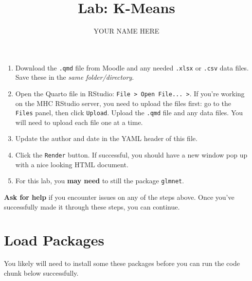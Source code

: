 \documentclass[
  letterpaper,
  DIV=11,
  numbers=noendperiod]{scrartcl}
\title{Lab: K-Means}
\author{YOUR NAME HERE}
\date{}
\begin{document}
\maketitle


\begin{tcolorbox}[enhanced jigsaw, opacitybacktitle=0.6, toprule=.15mm, left=2mm, toptitle=1mm, breakable, titlerule=0mm, colframe=quarto-callout-tip-color-frame, arc=.35mm, colback=white, colbacktitle=quarto-callout-tip-color!10!white, opacityback=0, bottomtitle=1mm, coltitle=black, title=\textcolor{quarto-callout-tip-color}{\faLightbulb}\hspace{0.5em}{Getting Started}, leftrule=.75mm, rightrule=.15mm, bottomrule=.15mm]

\begin{enumerate}
\def\labelenumi{\arabic{enumi}.}
\item
  Download the \texttt{.qmd} file from Moodle and any needed
  \texttt{.xlsx} or \texttt{.csv} data files. Save these in the
  \emph{same folder/directory}.
\item
  Open the Quarto file in RStudio:
  \texttt{File\ \textgreater{}\ Open\ File...\ \textgreater{}}. If
  you're working on the MHC RStudio server, you need to upload the files
  first: go to the \texttt{Files} panel, then click \texttt{Upload}.
  Upload the \texttt{.qmd} file and any data files. You will need to
  upload each file one at a time.
\item
  Update the author and date in the YAML header of this file.
\item
  Click the \texttt{Render} button. If successful, you should have a new
  window pop up with a nice looking HTML document.
\item
  For this lab, you \textbf{may need} to still the package
  \texttt{glmnet}.
\end{enumerate}

\textbf{Ask for help} if you encounter issues on any of the steps above.
Once you've successfully made it through these steps, you can continue.

\end{tcolorbox}

\section{Load Packages}\label{load-packages}

You likely will need to install some these packages before you can run
the code chunk below successfully.
\end{document}
